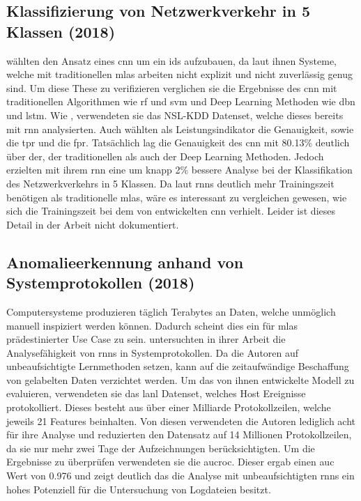 \documentclass[
    12pt, %
    DIV10,
    ngerman, %
    a4paper, %
    oneside, %
    titlepage, %
    parskip=half, %
    headings=normal, %
    listof=totoc, %
    bibliography=totoc, %
    index=totoc, %
    captions=tableheading, %
    final %
]{scrreprt}
\begin{document}
\subsection{Klassifizierung von Netzwerkverkehr in 5 Klassen (2018)}
\textcite{Ding2018} wählten den Ansatz eines \ac{cnn} um ein \ac{ids} aufzubauen, da laut ihnen Systeme, welche mit traditionellen \ac{mlas} arbeiten nicht explizit und nicht zuverlässig genug sind. Um diese These zu verifizieren verglichen sie die Ergebnisse des \ac{cnn} mit traditionellen Algorithmen wie \ac{rf} und \ac{svm} und Deep Learning Methoden wie \ac{dbn} und \ac{lstm}. Wie \textcite{Yin2017}, verwendeten sie das NSL-KDD Datenset, welche dieses bereits mit \ac{rnn} analysierten. Auch \textcite{Ding2018} wählten als Leistungsindikator die Genauigkeit, sowie die \ac{tpr} und die \ac{fpr}. Tatsächlich lag die Genauigkeit des \ac{cnn} mit 80.13\% deutlich über der, der traditionellen als auch der Deep Learning Methoden. Jedoch erzielten \textcite{Yin2017} mit ihrem \ac{rnn} eine um knapp 2\% bessere Analyse bei der Klassifikation des Netzwerkverkehrs in 5 Klassen. Da laut \textcite{Yin2017} \ac{rnns} deutlich mehr Trainingszeit benötigen als traditionelle \ac{mlas}, wäre es interessant zu vergleichen gewesen, wie sich die Trainingszeit bei dem von \textcite{Ding2018} entwickelten \ac{cnn} verhielt. Leider ist dieses Detail in der Arbeit nicht dokumentiert.
%
\subsection{Anomalieerkennung anhand von Systemprotokollen (2018)}
Computersysteme produzieren täglich Terabytes an Daten, welche unmöglich manuell inspiziert werden können. Dadurch scheint dies ein für \ac{mlas} prädestinierter Use Case zu sein. \textcite{Brown2018} untersuchten in ihrer Arbeit die Analysefähigkeit von \ac{rnns} in Systemprotokollen. Da die Autoren auf unbeaufsichtigte Lernmethoden setzen, kann auf die zeitaufwändige Beschaffung von gelabelten Daten verzichtet werden. Um das von ihnen entwickelte Modell zu evaluieren, verwendeten sie das \ac{lanl} Datenset, welches Host Ereignisse protokolliert. Dieses besteht aus über einer Milliarde Protokollzeilen, welche jeweils 21 Features beinhalten. Von diesen verwendeten die Autoren lediglich acht für ihre Analyse und reduzierten den Datensatz auf 14 Millionen Protokollzeilen, da sie nur mehr zwei Tage der Aufzeichnungen berücksichtigten. Um die Ergebnisse zu überprüfen verwendeten sie die \ac{aucroc}. Dieser ergab einen \ac{auc} Wert von 0.976 und zeigt deutlich das die Analyse mit unbeaufsichtigten \ac{rnns} ein hohes Potenziell für die Untersuchung von Logdateien besitzt.
%
\end{document}
